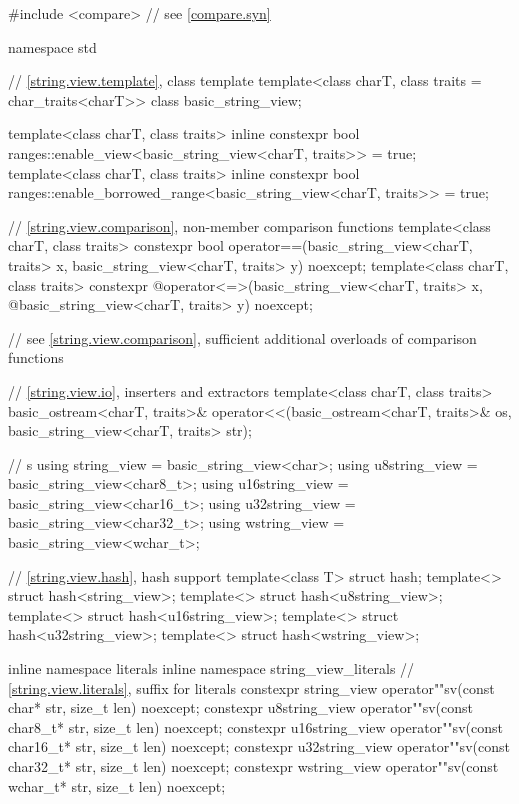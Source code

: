 %
\begin{codeblock}
#include <compare>              // see \ref{compare.syn}

namespace std {
  // \ref{string.view.template}, class template 
  template<class charT, class traits = char_traits<charT>>
  class basic_string_view;

  template<class charT, class traits>
    inline constexpr bool ranges::enable_view<basic_string_view<charT, traits>> = true;
  template<class charT, class traits>
    inline constexpr bool ranges::enable_borrowed_range<basic_string_view<charT, traits>> = true;

  // \ref{string.view.comparison}, non-member comparison functions
  template<class charT, class traits>
    constexpr bool operator==(basic_string_view<charT, traits> x,
                              basic_string_view<charT, traits> y) noexcept;
  template<class charT, class traits>
    constexpr @\seebelow@ operator<=>(basic_string_view<charT, traits> x,
              @\itcorr@                      basic_string_view<charT, traits> y) noexcept;

  // see \ref{string.view.comparison}, sufficient additional overloads of comparison functions

  // \ref{string.view.io}, inserters and extractors
  template<class charT, class traits>
    basic_ostream<charT, traits>&
      operator<<(basic_ostream<charT, traits>& os,
                 basic_string_view<charT, traits> str);

  //  s
  using string_view    = basic_string_view<char>;
  using u8string_view  = basic_string_view<char8_t>;
  using u16string_view = basic_string_view<char16_t>;
  using u32string_view = basic_string_view<char32_t>;
  using wstring_view   = basic_string_view<wchar_t>;

  // \ref{string.view.hash}, hash support
  template<class T> struct hash;
  template<> struct hash<string_view>;
  template<> struct hash<u8string_view>;
  template<> struct hash<u16string_view>;
  template<> struct hash<u32string_view>;
  template<> struct hash<wstring_view>;

  inline namespace literals {
  inline namespace string_view_literals {
    // \ref{string.view.literals}, suffix for  literals
    constexpr string_view    operator""sv(const char* str, size_t len) noexcept;
    constexpr u8string_view  operator""sv(const char8_t* str, size_t len) noexcept;
    constexpr u16string_view operator""sv(const char16_t* str, size_t len) noexcept;
    constexpr u32string_view operator""sv(const char32_t* str, size_t len) noexcept;
    constexpr wstring_view   operator""sv(const wchar_t* str, size_t len) noexcept;
  }
  }
}
\end{codeblock}

